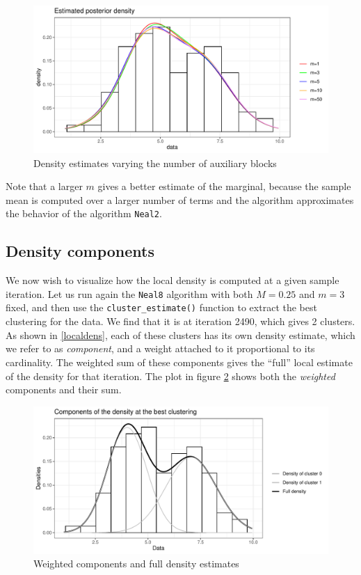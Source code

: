 \begin{figure}[h]
	\centering
	\includegraphics[scale=0.55]{etc/dens_withmM10.pdf}
	\caption{Density estimates varying the number of auxiliary blocks}

	\label{fig:density_n_aux}
\end{figure}

Note that a larger $m$ gives a better estimate of the marginal, because the sample mean is computed over a larger number of terms and the algorithm approximates the behavior of the algorithm \verb|Neal2|.



\subsection{Density components}
We now wish to visualize how the local density is computed at a given sample iteration.
Let us run again the \verb|Neal8| algorithm with both $M=0.25$ and $m=3$ fixed, and then use the \verb|cluster_estimate()| function to extract the best clustering for the data.
We find that it is at iteration 2490, which gives 2 clusters.
As shown in \ref{localdens}, each of these clusters has its own density estimate, which we refer to as \emph{component}, and a weight attached to it proportional to its cardinality.
The weighted sum of these components gives the ``full'' local estimate of the density for that iteration.
The plot in figure \ref{fig:components_density} shows both the \emph{weighted} components and their sum.
\begin{figure}[h]
	\centering
	\includegraphics[scale=0.6]{etc/componentsM025m3_best.pdf}
	\caption{Weighted components and full density estimates}

	\label{fig:components_density}
\end{figure}

